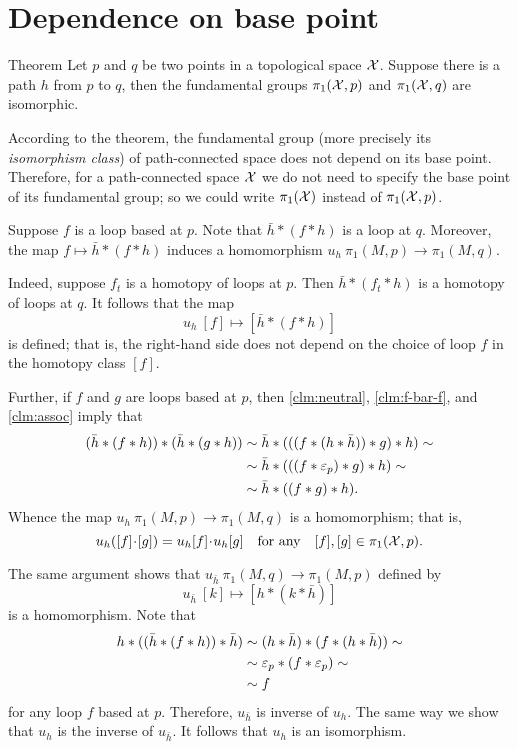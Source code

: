 \section{Dependence on base point}

\begin{thm}{Theorem}
Let $p$ and $q$ be two points in a topological space $\mathcal{X}$.
Suppose there is a path $h$ from $p$ to $q$, then 
the fundamental groups $\pi_1(\mathcal{X},p)$ and $\pi_1(\mathcal{X},q)$ are isomorphic.
\end{thm}

According to the theorem, the fundamental group (more precisely its \textit{isomorphism class}) of path-connected space does not depend on its base point.
Therefore, for a path-connected space $\mathcal{X}$ we do not need to specify the base point of its fundamental group; so we could write $\pi_1(\mathcal{X})$ instead of $\pi_1(\mathcal{X},p)$.

Suppose $f$ is a loop based at $p$.
Note that $\bar h*(f*h)$ is a loop at $q$.
Moreover, the map $f\mapsto \bar h*(f*h)$ induces a homomorphism $u_h\:\pi_1(M,p)\to\pi_1(M,q)$.

Indeed, suppose $f_t$ is a homotopy of loops at $p$.
Then $\bar h*(f_t*h)$ is a homotopy of loops at $q$.
It follows that the map 
\[u_h\:[f]\mapsto [\bar h*(f*h)]\]
is defined; that is, the right-hand side does not depend on the choice of loop $f$ in the homotopy class $[f]$. 

Further, if $f$ and $g$ are loops based at $p$, then \ref{clm:neutral}, \ref{clm:f-bar-f}, and  \ref{clm:assoc} imply that
\begin{align*}
(\bar h*(f*h))*(\bar h*(g*h))&\sim \bar h*(((f*(h*\bar h))*g)*h)\sim
\\
&\sim \bar h*(((f*\varepsilon_p)*g)*h)\sim 
\\
&\sim \bar h*((f*g)*h).
\end{align*}
Whence the map $u_h\:\pi_1(M,p)\to \pi_1(M,q)$ is a homomorphism;
that is, 
\[u_h([f]\cdot [g])=u_h[f]\cdot u_h[g]\quad\text{for any}\quad [f],[g]\in \pi_1(\c{X},p).\]

The same argument shows that $u_{\bar h}\: \pi_1(M,q)\to \pi_1(M,p)$ defined by 
\[u_{\bar h}\:[k]\mapsto [h*(k*\bar h)]\]
is a homomorphism.
Note that 
\begin{align*}
h*((\bar h*(f*h))*\bar h)&\sim (h*\bar h)*(f*(h*\bar h))\sim
\\
&\sim \varepsilon_p*(f*\varepsilon_p)\sim
\\
&\sim f
\end{align*}
for any loop $f$ based at $p$.
Therefore, $u_{\bar h}$ is inverse of $u_h$.
The same way we show that $u_{h}$ is the inverse of $u_{\bar h}$.
It follows that $u_h$ is an isomorphism.
\qeds

